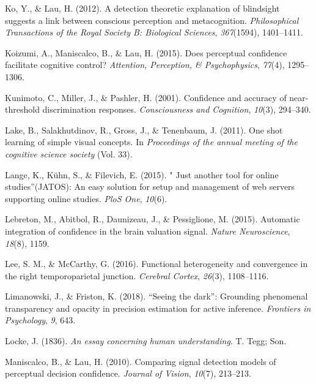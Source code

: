\documentclass[12pt,twoside]{reedthesis}
\begin{document}
\leavevmode\hypertarget{ref-ko2012detection}{}%
Ko, Y., \& Lau, H. (2012). A detection theoretic explanation of blindsight suggests a link between conscious perception and metacognition. \emph{Philosophical Transactions of the Royal Society B: Biological Sciences}, \emph{367}(1594), 1401--1411.

\leavevmode\hypertarget{ref-koizumi2015does}{}%
Koizumi, A., Maniscalco, B., \& Lau, H. (2015). Does perceptual confidence facilitate cognitive control? \emph{Attention, Perception, \& Psychophysics}, \emph{77}(4), 1295--1306.

\leavevmode\hypertarget{ref-kunimoto2001confidence}{}%
Kunimoto, C., Miller, J., \& Pashler, H. (2001). Confidence and accuracy of near-threshold discrimination responses. \emph{Consciousness and Cognition}, \emph{10}(3), 294--340.

\leavevmode\hypertarget{ref-lake2011one}{}%
Lake, B., Salakhutdinov, R., Gross, J., \& Tenenbaum, J. (2011). One shot learning of simple visual concepts. In \emph{Proceedings of the annual meeting of the cognitive science society} (Vol. 33).

\leavevmode\hypertarget{ref-lange2015just}{}%
Lange, K., Kühn, S., \& Filevich, E. (2015). " Just another tool for online studies''(JATOS): An easy solution for setup and management of web servers supporting online studies. \emph{PloS One}, \emph{10}(6).

\leavevmode\hypertarget{ref-lebreton2015automatic}{}%
Lebreton, M., Abitbol, R., Daunizeau, J., \& Pessiglione, M. (2015). Automatic integration of confidence in the brain valuation signal. \emph{Nature Neuroscience}, \emph{18}(8), 1159.

\leavevmode\hypertarget{ref-lee2016functional}{}%
Lee, S. M., \& McCarthy, G. (2016). Functional heterogeneity and convergence in the right temporoparietal junction. \emph{Cerebral Cortex}, \emph{26}(3), 1108--1116.

\leavevmode\hypertarget{ref-limanowski2018seeing}{}%
Limanowski, J., \& Friston, K. (2018). ``Seeing the dark'': Grounding phenomenal transparency and opacity in precision estimation for active inference. \emph{Frontiers in Psychology}, \emph{9}, 643.

\leavevmode\hypertarget{ref-locke1836essay}{}%
Locke, J. (1836). \emph{An essay concerning human understanding}. T. Tegg; Son.

\leavevmode\hypertarget{ref-maniscalco2010comparing}{}%
Maniscalco, B., \& Lau, H. (2010). Comparing signal detection models of perceptual decision confidence. \emph{Journal of Vision}, \emph{10}(7), 213--213.
\end{document}
